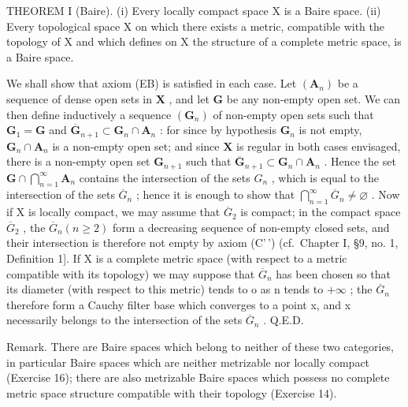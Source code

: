 THEOREM I (Baire). (i) Every locally compact space X is a Baire space. (ii) Every topological space X on which there exists a metric, compatible with the topology of X and which defines on X the structure of a complete metric space, is a Baire space.

We shall show that axiom (EB) is satisfied in each case. Let \((\mathbf{A}_n)\) be a sequence of dense open sets in \(\mathbf{X}\) , and let \(\mathbf{G}\) be any non-empty open set. We can then define inductively a sequence \((\mathbf{G}_n)\) of non-empty open sets such that \(\mathbf{G}_1 = \mathbf{G}\) and \(\overline{\mathbf{G}}_{n+1} \subset \mathbf{G}_n \cap \mathbf{A}_n\) : for since by hypothesis \(\mathbf{G}_n\) is not empty, \(\mathbf{G}_n \cap \mathbf{A}_n\) is a non-empty open set; and since \(\mathbf{X}\) is regular in both cases envisaged, there is a non-empty open set \(\mathbf{G}_{n+1}\) such that \(\overline{\mathbf{G}}_{n+1} \subset \mathbf{G}_n \cap \mathbf{A}_n\) . Hence the set \(\mathbf{G} \cap \bigcap_{n=1}^{\infty} \mathbf{A}_n\) contains the intersection of the sets \(G_{n}\) , which is equal to the intersection of the sets \(\overline{G}_{n}\) ; hence it is enough to show that \(\bigcap_{n=1}^{\infty}\overline{G}_{n}\neq\varnothing\) . Now if X is locally compact, we may assume that \(\overline{G}_{2}\) is compact; in the compact space \(\overline{G}_{2}\) , the \(\overline{G}_{n}(n\geqslant2)\) form a decreasing sequence of non-empty closed sets, and their intersection is therefore not empty by axiom (C'\,') (cf.~Chapter I, §9, no. 1, Definition 1{]}. If X is a complete metric space (with respect to a metric compatible with its topology) we may suppose that \(\overline{G}_{n}\) has been chosen so that its diameter (with respect to this metric) tends to o as n tends to \(+\infty\) ; the \(\overline{G}_{n}\) therefore form a Cauchy filter base which converges to a point x, and x necessarily belongs to the intersection of the sets \(\overline{G}_{n}\) . Q.E.D.

Remark. There are Baire spaces which belong to neither of these two categories, in particular Baire spaces which are neither metrizable nor locally compact (Exercise 16); there are also metrizable Baire spaces which possess no complete metric space structure compatible with their topology (Exercise 14).

